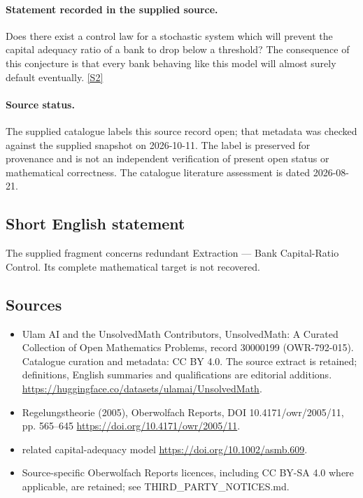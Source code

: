 \documentclass[11pt]{article}
\newcommand{\sref}[2]{\hyperlink{source:#1:#2}{[S#2]}}
\begin{document}
\paragraph{Statement recorded in the supplied source.}
Does there exist a control law for a stochastic system which will prevent the capital adequacy ratio of a bank to drop below a threshold? The consequence of this conjecture is that every bank behaving like this model will almost surely default eventually. \sref{30000199}{2}
\paragraph{Source status.}
The supplied catalogue labels this source record open; that metadata was checked against the supplied snapshot on 2026-10-11. The label is preserved for provenance and is not an independent verification of present open status or mathematical correctness. The catalogue literature assessment is dated 2026-08-21.
\subsection{Short English statement}
The supplied fragment concerns redundant Extraction — Bank Capital-Ratio Control. Its complete mathematical target is not recovered.
\subsection{Sources}
\begin{itemize}
\item[\hypertarget{source:30000199:1}{S1}] Ulam AI and the UnsolvedMath Contributors, UnsolvedMath: A Curated Collection of Open Mathematics Problems, record 30000199 (OWR-792-015). Catalogue curation and metadata: CC BY 4.0. The source extract is retained; definitions, English summaries and qualifications are editorial additions.
\url{https://huggingface.co/datasets/ulamai/UnsolvedMath}.
\item[\hypertarget{source:30000199:2}{S2}] Regelungstheorie (2005), Oberwolfach Reports, DOI 10.4171/owr/2005/11, pp. 565--645
\url{https://doi.org/10.4171/owr/2005/11}.
\item[\hypertarget{source:30000199:3}{S3}] related capital-adequacy model
\url{https://doi.org/10.1002/asmb.609}.
\item Source-specific Oberwolfach Reports licences, including CC BY-SA 4.0 where applicable, are retained; see THIRD\_PARTY\_NOTICES.md.
\end{itemize}
\end{document}
